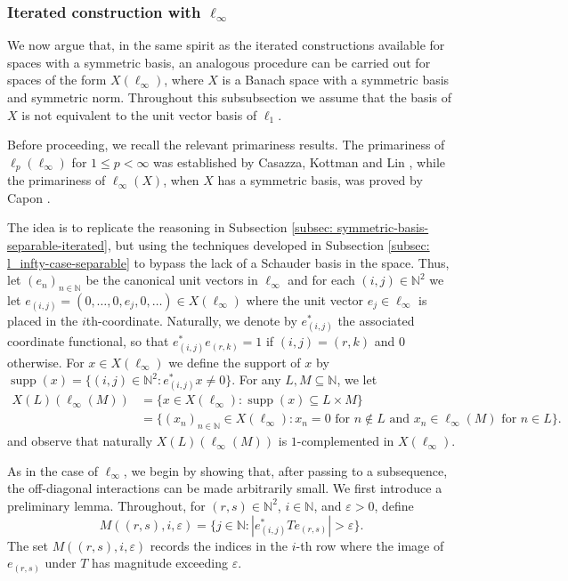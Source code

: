 \documentclass[11pt]{amsart}
\theoremstyle{plain}
\theoremstyle{definition}
\numberwithin{equation}{section}
\newcommand{\N}{\mathbb{N}}
\newcommand{\supp}{\operatorname{supp}}
\renewcommand{\le}{\leqslant}
\begin{document}
\subsubsection{Iterated construction with $\ell_\infty$}\label{subsec: l_infty-iterated} We now argue that, in the same spirit as the iterated constructions available for spaces with a symmetric basis, an analogous procedure can be carried out for spaces of the form $X(\ell_\infty)$, where $X$ is a Banach space with a symmetric basis and symmetric norm. Throughout this subsubsection we assume that the basis of $X$ is not equivalent to the unit vector basis of $\ell_1$.

Before proceeding, we recall the relevant primariness results. The primariness of $\ell_p(\ell_\infty)$ for $1 \le p < \infty$ was established by Casazza, Kottman and Lin \cite{CKL1976}, while the primariness of $\ell_\infty(X)$, when $X$ has a symmetric basis, was proved by Capon \cite{Capon1982PLMS}. 


The idea is to replicate the reasoning in Subsection \ref{subsec: symmetric-basis-separable-iterated}, but using the techniques developed in Subsection \ref{subsec: l_infty-case-separable} to bypass the lack of a Schauder basis in the space. Thus, let $(e_n)_{n \in \N}$ be the canonical unit vectors in $\ell_\infty$ and for each $(i,j) \in \N^{2}$ we let $e_{(i,j)} = (0, \dots, 0, e_j, 0, \dots) \in X(\ell_\infty)$ where the unit vector $e_j \in \ell_\infty$ is placed in the $i$th-coordinate. Naturally, we denote by $e_{(i,j)}^*$ the associated coordinate functional, so that $e^*_{(i,j)} e_{(r,k)} = 1$ if $(i,j) = (r,k)$ and $0$ otherwise. For $x \in X(\ell_\infty)$ we define the support of $x$ by $\supp{(x)} = \{(i,j) \in \N^2: e^*_{(i,j)}x \not = 0 \}$. For any $L, M \subseteq \N$, we let
\begin{align*}
X(L)(\ell_\infty(M))
    &= \{ x \in X(\ell_\infty) : \supp(x) \subseteq L \times M \} \\
    &= \{ (x_n)_{n \in \mathbb{N}} \in X(\ell_\infty) :
       x_n = 0 \text{ for } n \notin L
       \text{ and } x_n \in \ell_\infty(M) \text{ for } n \in L \}.
\end{align*}
and observe that naturally $X(L)(\ell_\infty(M))$ is $1$-complemented in $X(\ell_\infty)$. 

As in the case of $\ell_\infty$, we begin by showing that, after passing to a subsequence, the off-diagonal interactions can be made arbitrarily small. We first introduce a preliminary lemma. Throughout, for $(r,s) \in \N^2$, $i \in \N$, and $\varepsilon > 0$, define
\begin{equation*}
    M((r,s), i, \varepsilon) = \{ j \in \N : |e^*_{(i,j)} T e_{(r,s)}| > \varepsilon \}.
\end{equation*}
The set $M((r,s), i, \varepsilon)$ records the indices in the $i$-th row where the image of $e_{(r,s)}$ under $T$ has magnitude exceeding $\varepsilon$.
\end{document}
